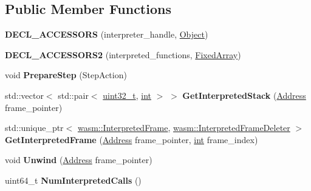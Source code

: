 \subsection*{Public Member Functions}
\begin{DoxyCompactItemize}
\item 
\mbox{\label{classv8_1_1internal_1_1WasmDebugInfo_af6956e34b2598f372b214494bb4d5423}} 
{\bfseries D\+E\+C\+L\+\_\+\+A\+C\+C\+E\+S\+S\+O\+RS} (interpreter\+\_\+handle, \mbox{\hyperlink{classv8_1_1internal_1_1Object}{Object}})
\item 
\mbox{\label{classv8_1_1internal_1_1WasmDebugInfo_aba977310a17e1ec277ac173af84f0f07}} 
{\bfseries D\+E\+C\+L\+\_\+\+A\+C\+C\+E\+S\+S\+O\+R\+S2} (interpreted\+\_\+functions, \mbox{\hyperlink{classv8_1_1internal_1_1FixedArray}{Fixed\+Array}})
\item 
\mbox{\label{classv8_1_1internal_1_1WasmDebugInfo_a0e1900b59a880a87fe5c77375d7051ab}} 
void {\bfseries Prepare\+Step} (Step\+Action)
\item 
\mbox{\label{classv8_1_1internal_1_1WasmDebugInfo_a34127003bf7a18c49ad0fd636695e364}} 
std\+::vector$<$ std\+::pair$<$ \mbox{\hyperlink{classuint32__t}{uint32\+\_\+t}}, \mbox{\hyperlink{classint}{int}} $>$ $>$ {\bfseries Get\+Interpreted\+Stack} (\mbox{\hyperlink{classuintptr__t}{Address}} frame\+\_\+pointer)
\item 
\mbox{\label{classv8_1_1internal_1_1WasmDebugInfo_a274f7aff8476cac41eef60ccf6dddf14}} 
std\+::unique\+\_\+ptr$<$ \mbox{\hyperlink{classv8_1_1internal_1_1wasm_1_1InterpretedFrame}{wasm\+::\+Interpreted\+Frame}}, \mbox{\hyperlink{structv8_1_1internal_1_1wasm_1_1InterpretedFrameDeleter}{wasm\+::\+Interpreted\+Frame\+Deleter}} $>$ {\bfseries Get\+Interpreted\+Frame} (\mbox{\hyperlink{classuintptr__t}{Address}} frame\+\_\+pointer, \mbox{\hyperlink{classint}{int}} frame\+\_\+index)
\item 
\mbox{\label{classv8_1_1internal_1_1WasmDebugInfo_a1aecb4831ae30a7e158d3e6dd26e5ee1}} 
void {\bfseries Unwind} (\mbox{\hyperlink{classuintptr__t}{Address}} frame\+\_\+pointer)
\item 
\mbox{\label{classv8_1_1internal_1_1WasmDebugInfo_aeb041d9175c888337e3201d7603d048e}} 
uint64\+\_\+t {\bfseries Num\+Interpreted\+Calls} ()
\end{DoxyCompactItemize}
